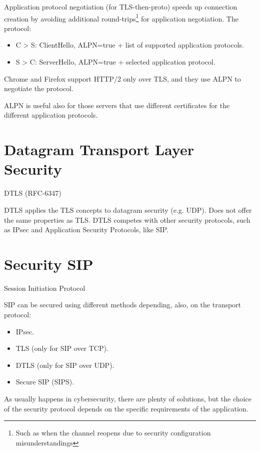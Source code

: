 Application protocol negotiation (for TLS-then-proto) speeds up connection creation by avoiding additional round-trips\footnote{Such as when the channel reopens due to security configuration misunderstandings} for application negotiation.
The protocol:
\begin{itemize}
    \item C > S: ClientHello, ALPN=true + list of supported application protocols.
    \item S > C: ServerHello, ALPN=true + selected application protocol.
\end{itemize}
\begin{tcolorbox}[colback=blue!10!white, colframe=blue!50!white]
Chrome and Firefox support HTTP/2 only over TLS, and they use ALPN to negotiate the protocol.
\end{tcolorbox}

ALPN is useful also for those servers that use different certificates for the different application protocols.
\section{Datagram Transport Layer Security}
\begin{center}
    DTLS (RFC-6347)
\end{center}
DTLS applies the TLS concepts to datagram security (e.g. UDP). Does not offer the same properties as TLS. DTLS competes with other security protocols, such as IPsec and Application Security Protocols, like SIP.

\vspace{1cm}

\section*{Security SIP}
\begin{center}
    Session Initiation Protocol
\end{center}

SIP can be secured using different methods depending, also, on the transport protocol:
\begin{itemize}
    \item IPsec.
    \item TLS (only for SIP over TCP).
    \item DTLS (only for SIP over UDP).
    \item Secure SIP (SIPS).
\end{itemize}

\begin{tcolorbox}[colback=red!10!white, colframe=red!70!black, coltitle=white, title=Beware]
As usually happens in cybersecurity, there are plenty of solutions, but the choice of the security protocol depends on the specific requirements of the application.
\end{tcolorbox}

